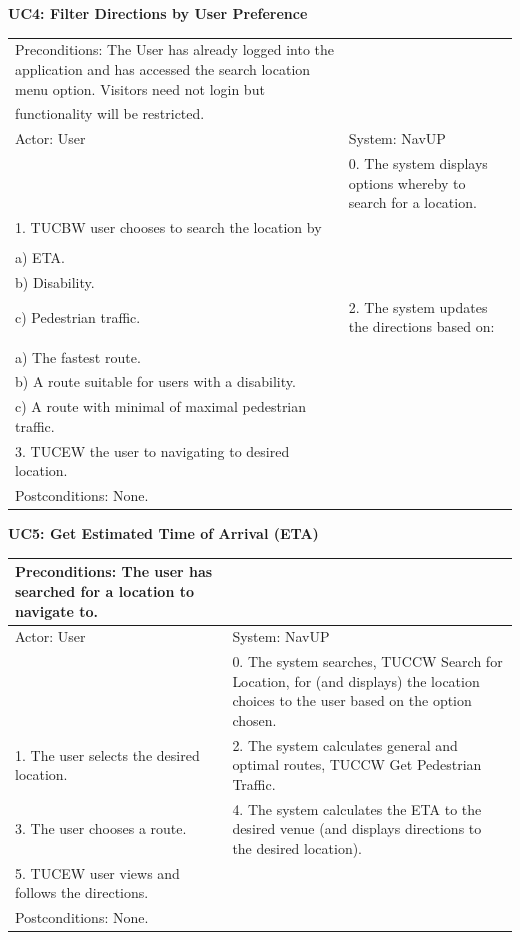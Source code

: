 \documentclass{article}
\begin{document}
		
        		\centering
					\textbf{UC4: Filter Directions by User Preference}\\
       		 \small
       		 \begin{tabular}{|p{8cm}|p{8cm}|}
       		 \hline
       		 Preconditions: The User has already logged into the application and has accessed the search location menu option. Visitors need not login but\\ functionality will be restricted.& \\
       		 \hline
       		 Actor: User & System: NavUP \\
        		\hline
       		 & 0.	The system displays options whereby to search for a location.\\
       		 \hline
       		 1.	TUCBW user chooses to search the location by \\

						\\a)	ETA.
						\\b)	Disability.
						\\c)	Pedestrian traffic.
 				& 2.	The system updates the directions based on:\\

						\\a)	The fastest route.
						\\b)	A route suitable for users with a disability.
						\\c)	A route with minimal of maximal pedestrian traffic.
\\
        		\hline
       		 	3.	TUCEW the user to navigating to desired location. &\\
       		 \hline
        		Postconditions: None.& \\
        		\hline
        \end{tabular} 
     

		
        		\centering
					\textbf{UC5: Get Estimated Time of Arrival (ETA)}\\
       		 \small
       		 \begin{tabular}{|p{8cm}|p{8cm}|}
       		 \hline
       		 Preconditions: The user has searched for a location to navigate to.& \\
       		 \hline
       		 Actor: User & System: NavUP \\
        		\hline
       		  & 0.	The system searches, TUCCW Search for Location, for (and displays) the location choices to the user based on the option chosen.\\
       		 \hline
       		 1.	The user selects the desired location. & 2.	The system calculates general and optimal routes, TUCCW Get Pedestrian Traffic.\\
        		\hline
       		 3.	The user chooses a route. & 4.	The system calculates the ETA to the desired venue (and displays directions to the desired location).\\
        		\hline
       		 5.	TUCEW user views and follows the directions. & \\
       		 \hline
        		Postconditions: None.& \\
        		\hline
        \end{tabular} 
        
\end{document}
